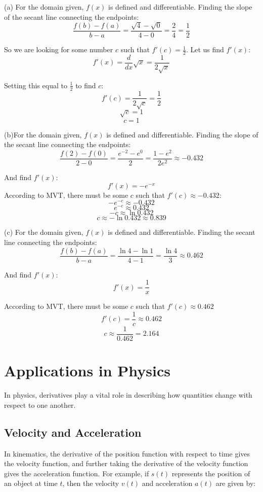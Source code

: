 \begin{Answer}
[ref=MVT2]
(a) For the domain given, $f(x)$ is defined and differentiable. Finding the 
slope of the secant line connecting the endpoints:
$$\frac{f(b)-f(a)}{b-a}=\frac{\sqrt{4}-\sqrt{0}}{4-0}=\frac{2}{4}=\frac{1}{2}$$

So we are looking for some number $c$ such that $f'(c) = \frac{1}{2}$. Let us 
find $f'(x)$:
$$f'(x) = \frac{d}{dx}\sqrt{x}=\frac{1}{2\sqrt{x}}$$

Setting this equal to $\frac{1}{2}$ to find $c$:
$$f'(c) = \frac{1}{2\sqrt{c}}=\frac{1}{2}$$
$$\sqrt{c}=1$$
$$c=1$$

(b)For the domain given, $f(x)$ is defined and differentiable. Finding the 
slope of the secant line connecting the endpoints:
$$\frac{f(2) - f(0)}{2 - 0}=\frac{e^{-2} - e^{0}}{2}=\frac{1 - e^{2}}{2e^{2}} 
\approx -0.432$$

And find $f'(x)$:
$$f'(x) = -e^{-x}$$
According to MVT, there must be some $c$ such that $f'(c) \approx-0.432$:
$$-e^{-c} \approx -0.432$$
$$e^{-c}\approx 0.432$$
$$-c \approx \ln{0.432}$$
$$c \approx -\ln{0.432} \approx 0.839$$

(c) For the domain given, $f(x)$ is defined and differentiable. Finding the 
secant line connecting the endpoints:
$$\frac{f(b) - f(a)}{b - a}=\frac{\ln{4} - \ln{1}}{4 - 1} = \frac{\ln{4}}{3} 
\approx 0.462$$

And find $f'(x)$:
$$f'(x) = \frac{1}{x}$$

According to MVT, there must be some $c$ such that $f'(c) \approx 0.462$
$$f'(c) = \frac{1}{c} \approx 0.462$$
$$c \approx \frac{1}{0.462} = 2.164$$
\end{Answer}



\section{Applications in Physics}

In physics, derivatives play a vital role in describing how quantities change 
with respect to one another.

\subsection{Velocity and Acceleration}

In kinematics, the derivative of the position function with respect to time 
gives the velocity function, and further taking the derivative of the velocity 
function gives the acceleration function. For example, if $s(t)$ represents 
the position of an object at time $t$, then the velocity $v(t)$ and 
acceleration $a(t)$ are given by:

